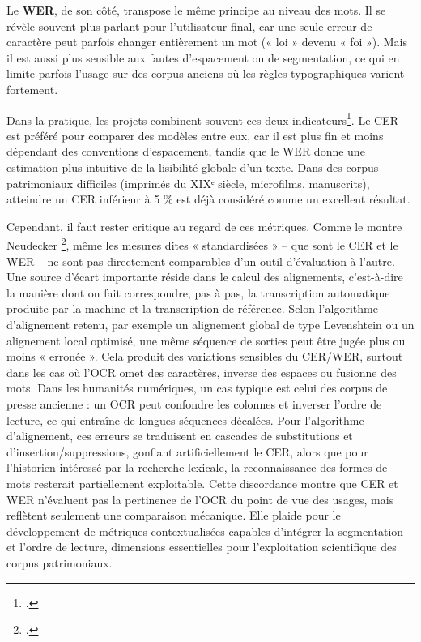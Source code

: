 Le \textbf{WER}, de son côté, transpose le même principe au niveau des mots. Il se révèle souvent plus parlant pour l’utilisateur final, car une seule erreur de caractère peut parfois changer entièrement un mot (« loi » devenu « foi »). Mais il est aussi plus sensible aux fautes d’espacement ou de segmentation, ce qui en limite parfois l’usage sur des corpus anciens où les règles typographiques varient fortement.

Dans la pratique, les projets combinent souvent ces deux indicateurs\footcite[][]{fleischhacker}. Le CER est préféré pour comparer des modèles entre eux, car il est plus fin et moins dépendant des conventions d’espacement, tandis que le WER donne une estimation plus intuitive de la lisibilité globale d’un texte. Dans des corpus patrimoniaux difficiles (imprimés du XIXᵉ siècle, microfilms, manuscrits), atteindre un CER inférieur à 5 \% est déjà considéré comme un excellent résultat.

Cependant, il faut rester critique au regard de ces métriques. Comme le montre Neudecker \footcite[][]{neudecker}, même les mesures dites « standardisées »  -- que sont le CER et le WER -- ne sont pas directement comparables d’un outil d’évaluation à l’autre. Une source d’écart importante réside dans le calcul des alignements, c’est-à-dire la manière dont on fait correspondre, pas à pas, la transcription automatique produite par la machine et la transcription de référence. Selon l’algorithme d’alignement retenu, par exemple un alignement global de type Levenshtein ou un alignement local optimisé, une même séquence de sorties peut être jugée plus ou moins « erronée ». Cela produit des variations sensibles du CER/WER, surtout dans les cas où l’OCR omet des caractères, inverse des espaces ou fusionne des mots. Dans les humanités numériques, un cas typique est celui des corpus de presse ancienne : un OCR peut confondre les colonnes et inverser l’ordre de lecture, ce qui entraîne de longues séquences décalées. Pour l’algorithme d’alignement, ces erreurs se traduisent en cascades de substitutions et d’insertion/suppressions, gonflant artificiellement le CER, alors que pour l’historien intéressé par la recherche lexicale, la reconnaissance des formes de mots resterait partiellement exploitable. Cette discordance montre que CER et WER n’évaluent pas la pertinence de l’OCR du point de vue des usages, mais reflètent seulement une comparaison mécanique. Elle plaide pour le développement de métriques contextualisées capables d’intégrer la segmentation et l’ordre de lecture, dimensions essentielles pour l’exploitation scientifique des corpus patrimoniaux.

